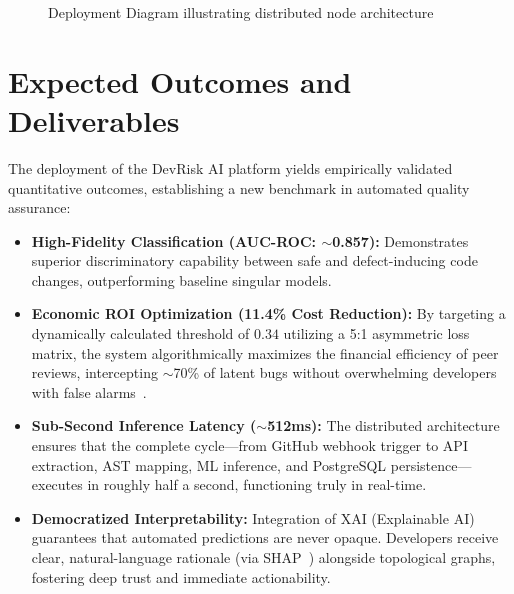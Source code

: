 \documentclass[12pt, a4paper]{article}
\begin{document}
\begin{figure}[h!]
\caption{Deployment Diagram illustrating distributed node architecture}
\label{fig:deployment}
\end{figure}

\clearpage
\section{Expected Outcomes and Deliverables}

The deployment of the DevRisk AI platform yields empirically validated quantitative outcomes, establishing a new benchmark in automated quality assurance:

\begin{itemize}
    \item \textbf{High-Fidelity Classification (AUC-ROC: $\sim$0.857):} Demonstrates superior discriminatory capability between safe and defect-inducing code changes, outperforming baseline singular models.
    
    \item \textbf{Economic ROI Optimization (11.4\% Cost Reduction):} By targeting a dynamically calculated threshold of $0.34$ utilizing a 5:1 asymmetric loss matrix, the system algorithmically maximizes the financial efficiency of peer reviews, intercepting $\sim$70\% of latent bugs without overwhelming developers with false alarms~\cite{elkan2001}.
    
    \item \textbf{Sub-Second Inference Latency ($\sim$512ms):} The distributed architecture ensures that the complete cycle---from GitHub webhook trigger to API extraction, AST mapping, ML inference, and PostgreSQL persistence---executes in roughly half a second, functioning truly in real-time.
    
    \item \textbf{Democratized Interpretability:} Integration of XAI (Explainable AI) guarantees that automated predictions are never opaque. Developers receive clear, natural-language rationale (via SHAP~\cite{lundberg2017}) alongside topological graphs, fostering deep trust and immediate actionability.
\end{itemize}
\end{document}

